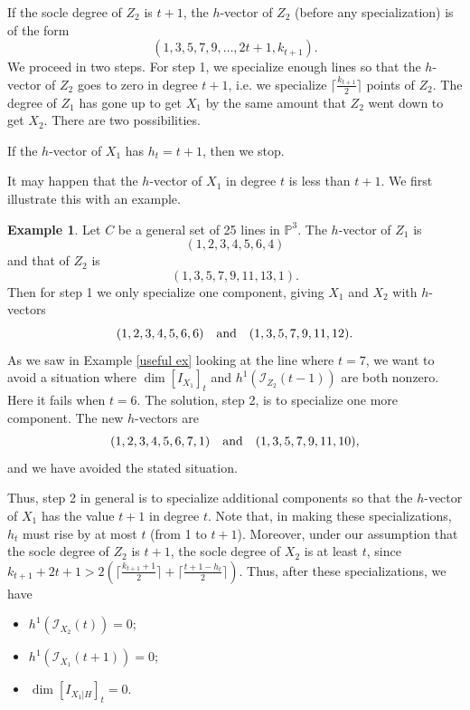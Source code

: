 \documentclass[12pt]{amsart}%
\numberwithin{equation}{section}
\theoremstyle{definition}
\newtheorem{example}[theorem]{Example}
\numberwithin{equation}{section}
\newcounter{step}
\begin{document}
\vspace{.2in}

 If the socle degree of $Z_2$ is $t+1$,  the $h$-vector of  $Z_2$ (before any specialization) is of the form 
\[
(1,3,5,7,9,\dots,2t+1, k_{t+1}).
\]
{We proceed in two steps.} 
For step 1, we specialize enough lines so that the $h$-vector of $Z_2$ goes to zero in degree $t+1$, i.e. we specialize $\lceil \frac{k_{t+1}}{2} \rceil$ points of $Z_2$. The degree of $Z_1$ has gone up to get $X_1$ by the same amount that $Z_2$ went down to get $X_2$. There are two possibilities.

\vspace{.2in}

 If the $h$-vector of $X_1$ has $h_t = t+1$, then we stop.

\vspace{.2in}

 It may happen that the $h$-vector of $X_1$ in degree $t$ is less than $t+1$. We first illustrate this with an example. 

 \begin{example}
     Let $C$ be a general set of 25 lines in $\mathbb P^3$. The $h$-vector of $Z_1$ is
     \[
     (1,2,3,4,5,6,4)
     \]
     and that of $Z_2$ is 
     \[
     (1,3,5,7,9,11,13,1).
     \]
     Then for step 1 we only specialize one component, giving $X_1$ and $X_2$ with $h$-vectors
     \[
     (1,2,3,4,5,6,6) \ \ \hbox{ and } \ \ (1,3,5,7,9,11,12).
     \]
As we saw in Example \ref{useful ex} looking at the line where $t=7$, we want to avoid a situation where $\dim [I_{X_1}]_t$ and $h^1(\mathcal I_{Z_2}(t-1))$ are both nonzero. Here it fails when $t=6$. The solution, step 2, is to specialize one more component. The new $h$-vectors are 
     \[
     (1,2,3,4,5,6,7,1) \ \ \hbox{ and } \ \ (1,3,5,7,9,11,10), 
     \]
and we have avoided the stated situation.
 \end{example}

Thus, step 2 in general is to specialize additional components so that the $h$-vector of $X_1$ has the value $t+1$ in degree $t$. Note that, in making these specializations, $h_t$ must rise by at most $t$ (from 1 to $t+1$). Moreover, under our assumption that the socle degree of $Z_2$ is $t+1$,  the socle degree of $X_2$ is at least $t$, since $k_{t+1} + 2t + 1 > 2 ( \lceil \frac{k_{t+1}+1}{2} \rceil + \lceil \frac{t+1 - h_t}{2} \rceil)$.
Thus, after these specializations, we have 
\begin{itemize}
    \item $h^1(\mathcal I_{X_2}(t)) = 0$;
    \item $h^1(\mathcal I_{X_1}(t+1)) = 0$;
    \item $\dim [I_{X_1|H}]_t = 0$.
\end{itemize}  
\end{document}
